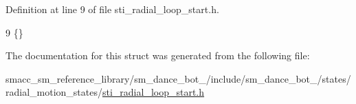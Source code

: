 Definition at line 9 of file sti\+\_\+radial\+\_\+loop\+\_\+start.\+h.


\begin{DoxyCode}
9 \{\}
\end{DoxyCode}


The documentation for this struct was generated from the following file\+:\begin{DoxyCompactItemize}
\item 
smacc\+\_\+sm\+\_\+reference\+\_\+library/sm\+\_\+dance\+\_\+bot\+\_/include/sm\+\_\+dance\+\_\+bot\+\_/states/radial\+\_\+motion\+\_\+states/\hyperlink{2_2include_2sm__dance__bot__2_2states_2radial__motion__states_2sti__radial__loop__start_8h}{sti\+\_\+radial\+\_\+loop\+\_\+start.\+h}\end{DoxyCompactItemize}
